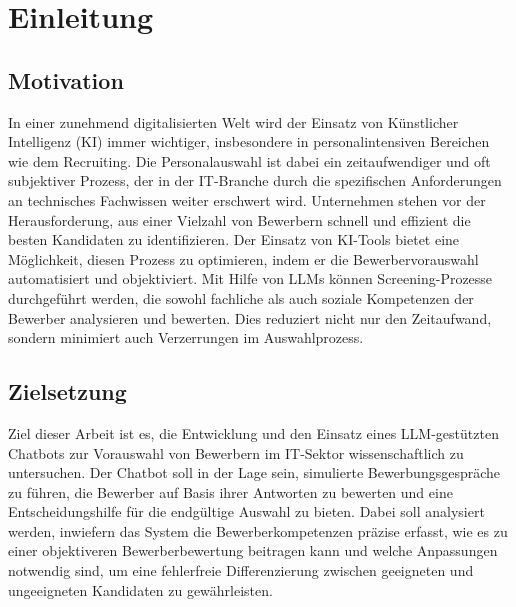
\chapter{Einleitung}

\section{Motivation}

In einer zunehmend digitalisierten Welt wird der Einsatz von Künstlicher Intelligenz (\acs{KI}) immer wichtiger, insbesondere in personalintensiven Bereichen wie dem Recruiting. 
Die Personalauswahl ist dabei ein zeitaufwendiger und oft subjektiver Prozess, der in der IT-Branche durch die spezifischen Anforderungen an technisches Fachwissen weiter erschwert wird. 
Unternehmen stehen vor der Herausforderung, aus einer Vielzahl von Bewerbern schnell und effizient die besten Kandidaten zu identifizieren. 
Der Einsatz von \acs{KI}-Tools bietet eine Möglichkeit, diesen Prozess zu optimieren, indem er die Bewerbervorauswahl automatisiert und objektiviert. 
Mit Hilfe von \acp{LLM} können Screening-Prozesse durchgeführt werden, die sowohl fachliche als auch soziale Kompetenzen der Bewerber analysieren und bewerten. 
Dies reduziert nicht nur den Zeitaufwand, sondern minimiert auch Verzerrungen im Auswahlprozess.

\section{Zielsetzung}

Ziel dieser Arbeit ist es, die Entwicklung und den Einsatz eines \acs{LLM}-gestützten Chatbots zur Vorauswahl von Bewerbern im IT-Sektor wissenschaftlich zu untersuchen. 
Der Chatbot soll in der Lage sein, simulierte Bewerbungsgespräche zu führen, die Bewerber auf Basis ihrer Antworten zu bewerten und eine Entscheidungshilfe für die endgültige Auswahl zu bieten. 
Dabei soll analysiert werden, inwiefern das System die Bewerberkompetenzen präzise erfasst, wie es zu einer objektiveren Bewerberbewertung beitragen kann und welche Anpassungen notwendig sind, um eine fehlerfreie Differenzierung zwischen geeigneten und ungeeigneten Kandidaten zu gewährleisten.
